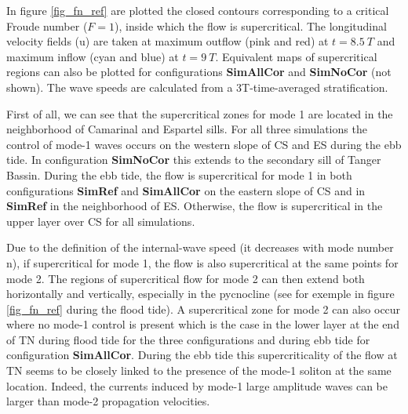 In figure %
 \ref{fig_fn_ref} are plotted the closed contours corresponding to a critical Froude number ($F=1$), inside which the flow is supercritical. The longitudinal velocity fields (u) are taken at maximum outflow (pink and red) at $t = 8.5\ T$ and maximum inflow (cyan and blue) at $t = 9\ T$.
Equivalent maps of supercritical regions can also be plotted for configurations \textbf{SimAllCor} and \textbf{SimNoCor} (not shown).
 The wave speeds are calculated from %
 a 3T-time-averaged stratification.%

First of all, we can see that the supercritical zones for mode 1 are located in the neighborhood of Camarinal and Espartel sills. For all three simulations the control of mode-1 waves occurs on the western slope of CS and ES during the ebb tide. In configuration \textbf{SimNoCor} this extends to the secondary sill of Tanger Bassin. During the ebb tide, the flow is supercritical for mode 1 in both configurations \textbf{SimRef} and \textbf{SimAllCor} on the eastern slope of CS and in \textbf{SimRef} in the neighborhood of ES. Otherwise, the flow is supercritical in the upper layer over CS for all simulations.

Due to the definition of the internal-wave speed (it decreases with mode number n), if supercritical for mode 1, the flow is also supercritical at the same points for mode 2. The regions of supercritical flow for mode 2 can then extend both horizontally and vertically, especially in the pycnocline (see for exemple in figure \ref{fig_fn_ref} during the flood tide).%
A supercritical zone for mode 2 can also occur where no mode-1 control is present which is the case in the lower layer at the end of TN during flood tide for the three configurations and during ebb tide for configuration \textbf{SimAllCor}. During the ebb tide this supercriticality of the flow at TN seems to be closely linked to the presence of the mode-1 soliton at the same location. Indeed, the currents induced by mode-1 large amplitude waves can be larger than mode-2 propagation velocities.  

